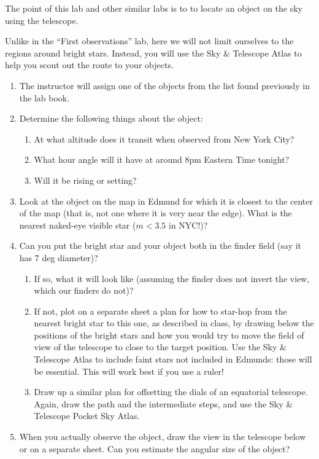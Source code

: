 
\noindent The point of this lab and other similar labs is to 
to locate an object on the sky using the telescope.

\noindent Unlike in the ``First observations'' lab, here we will not
limit ourselves to the regions around bright stars.  Instead, you will
use the Sky \& Telescope Atlas to help you scout out the route to your
objects.  

\begin{enumerate}  
\item The instructor will assign one of the objects from the list
found previously in the lab book.
\item Determine the following things about the object:
\begin{enumerate}
\item At what altitude does it transit when observed from New York City?
\item What hour angle will it have at around 
8pm Eastern Time tonight?
\item Will it be rising or setting?
\end{enumerate}
\item Look at the object on the map in Edmund for which it is closest
to the center of the map (that is, not one where it is very near the
edge). What is the nearest naked-eye visible star ($m<3.5$ in NYC!)?
\vspace{40pt}
\item Can you put the bright star and your object both in the finder
field (say it has 7 deg diameter)? 
\begin{enumerate}
\item If so,  what it will look like
(assuming the finder does not invert the view, which our finders do
not)?
\vspace{180pt}
\clearpage
\item If not, plot on a separate sheet a plan for how to star-hop from
  the nearest bright star to this one, as described in class, by
  drawing below the positions of the bright stars and how you would
  try to move the field of view of the telescope to close to the
  target position. Use the Sky \& Telescope Atlas to include faint
  stars not included in Edmunds: those will be essential. This will
  work best if you use a ruler!
\item Draw up a similar plan for offsetting the dials of an equatorial
  telescope.  Again, draw the path and the intermediate steps, and use
  the Sky \& Telescope Pocket Sky Atlas. 
\end{enumerate}
\vspace{220pt}
\item When you actually
  observe the object, draw the view in the telescope below or on a
  separate sheet. Can you estimate the angular size of the object? 
\end{enumerate}

\clearpage

~
